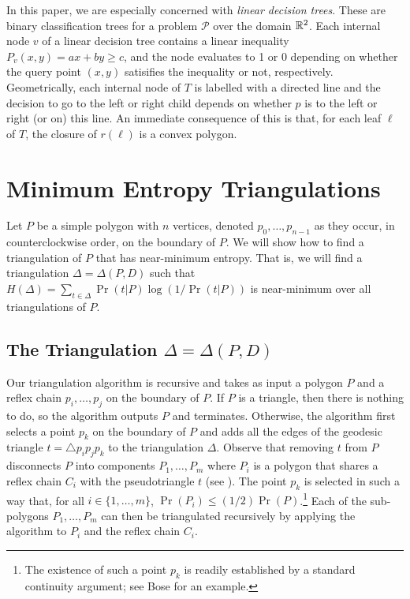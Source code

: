\documentclass[lotsofwhite]{patmorin}
\begin{document}
In this paper, we are especially concerned with \emph{linear decision
trees}. These are binary classification trees for a problem
$\mathcal{P}$ over the domain $\mathbb{R}^2$.  Each internal node $v$ of a
linear decision tree contains a linear inequality $P_v(x,y)=ax+by \ge
c$, and the node evaluates to 1 or 0 depending on whether the query
point $(x,y)$ satisifies the inequality or not, respectively.
Geometrically, each internal node of $T$ is labelled with a directed
line and the decision to go to the left or right child depends on
whether $p$ is to the left or right (or on) this line.  An immediate
consequence of this is that, for each leaf $\ell$ of $T$, the closure
of $r(\ell)$ is a convex polygon. 


\section{Minimum Entropy Triangulations} 

Let $P$ be a simple polygon with $n$ vertices, denoted
$p_0,\ldots,p_{n-1}$ as they occur, in counterclockwise order, on the
boundary of $P$.    We will show how to find a
triangulation of $P$ that has near-minimum entropy.  That is, we will
find a triangulation $\Delta=\Delta(P,D)$ such that $H(\Delta) =
\sum_{t\in\Delta} \Pr(t|P)\log(1/\Pr(t|P))$ is near-minimum over all
triangulations of $P$.  

\subsection{The Triangulation $\Delta=\Delta(P,D)$}

Our triangulation algorithm is recursive and takes as input a polygon
$P$ and a reflex chain $p_i,\ldots,p_j$ on the boundary of $P$.  If
$P$ is a triangle, then there is nothing to do, so the algorithm
outputs $P$ and terminates. Otherwise, the
algorithm first selects a point $p_k$ on the boundary of $P$ and adds
all the edges of the geodesic triangle $t=\triangle p_ip_jp_k$ to the
triangulation $\Delta$.
Observe that removing $t$ from $P$ disconnects $P$ into
components $P_1,\ldots,P_m$ where $P_i$ is a polygon that shares a
reflex chain $C_i$ with the pseudotriangle $t$ (see
).  The point
$p_k$ is selected in such a way that, for all $i\in\{1,\ldots,m\}$, $\Pr(P_i)
\le (1/2)\Pr(P)$.\footnote{The existence of such a point $p_k$ is
readily established by a standard continuity argument; see Bose \etal
\cite{bdhlim07} for an example.} Each of the sub-polygons $P_1,\ldots,P_m$
can then be triangulated recursively by applying the algorithm to
$P_i$ and the reflex chain $C_i$.
\end{document}
